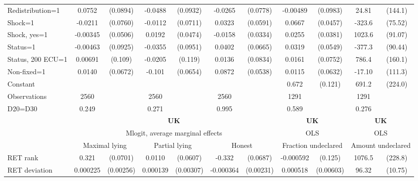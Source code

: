 \begin{tabular}{l|cccccc|cc|cc}
Redistribution=1&   0.0752         & (0.0894)&  -0.0488         & (0.0932)&  -0.0265         & (0.0778)& -0.00489         & (0.0983)&    24.81         &  (144.1)\\
Shock=1         &  -0.0211         & (0.0760)&  -0.0112         & (0.0711)&   0.0323         & (0.0591)&   0.0667         & (0.0457)&   -323.6\sym{***}&  (75.52)\\
Shock, yes=1    & -0.00345         & (0.0506)&   0.0192         & (0.0474)&  -0.0158         & (0.0334)&   0.0255         & (0.0381)&   1023.6\sym{***}&  (91.07)\\
Status=1        & -0.00463         & (0.0925)&  -0.0355         & (0.0951)&   0.0402         & (0.0665)&   0.0319         & (0.0549)&   -377.3\sym{***}&  (90.44)\\
Status, 200 ECU=1&  0.00691         &  (0.109)&  -0.0205         &  (0.119)&   0.0136         & (0.0834)&   0.0161         & (0.0752)&    786.4\sym{***}&  (160.1)\\
Non-fixed=1     &   0.0140         & (0.0672)&   -0.101         & (0.0654)&   0.0872         & (0.0538)&   0.0115         & (0.0632)&   -17.10         &  (111.3)\\
Constant        &                  &         &                  &         &                  &         &    0.672\sym{***}&  (0.121)&    691.2\sym{***}&  (224.0)\\
\hline
Observations    &     2560         &         &     2560         &         &     2560         &         &     1291         &         &     1291         &         \\
D20=D30         &    0.249         &         &    0.271         &         &    0.995         &         &    0.589         &         &    0.276         &         \\
\hline\hline
&\multicolumn{6}{c|}{\bf UK}&\multicolumn{2}{c|}{\bf UK}&\multicolumn{2}{c}{\bf UK}\\ &\multicolumn{6}{c|}{Mlogit, average marginal effects }&\multicolumn{2}{c|}{OLS}&\multicolumn{2}{c}{OLS}\\
                &\multicolumn{2}{c}{Maximal lying}&\multicolumn{2}{c}{Partial lying}&\multicolumn{2}{c}{Honest}  &\multicolumn{2}{c}{Fraction undeclared}&\multicolumn{2}{c}{Amount undeclared}\\
\hline
RET rank        &    0.321\sym{***}& (0.0701)&   0.0110         & (0.0607)&   -0.332\sym{***}& (0.0687)&-0.000592         &  (0.125)&   1076.5\sym{***}&  (228.8)\\
RET deviation   & 0.000225         &(0.00256)& 0.000139         &(0.00307)&-0.000364         &(0.00231)& 0.000518         &(0.00603)&    96.32\sym{***}&  (10.75)\\

\end{tabular}
